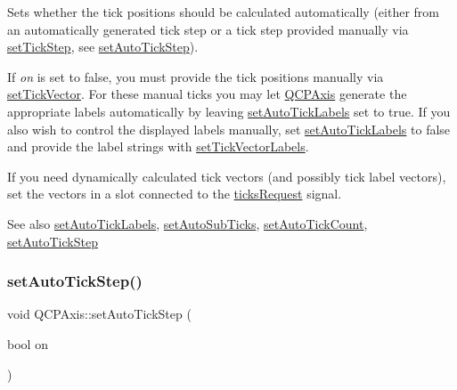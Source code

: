 Sets whether the tick positions should be calculated automatically (either from an automatically generated tick step or a tick step provided manually via \mbox{\hyperlink{class_q_c_p_axis_af727db0acc6492c4c774c0700e738205}{set\+Tick\+Step}}, see \mbox{\hyperlink{class_q_c_p_axis_a99fe77b034e06f5b723995beab96e741}{set\+Auto\+Tick\+Step}}).

If {\itshape on} is set to false, you must provide the tick positions manually via \mbox{\hyperlink{class_q_c_p_axis_a871db94c5d796c80fcbe1a9d4506e27e}{set\+Tick\+Vector}}. For these manual ticks you may let \mbox{\hyperlink{class_q_c_p_axis}{Q\+C\+P\+Axis}} generate the appropriate labels automatically by leaving \mbox{\hyperlink{class_q_c_p_axis_aaa47e3a6bac0c20d4beb9028f01bc1a1}{set\+Auto\+Tick\+Labels}} set to true. If you also wish to control the displayed labels manually, set \mbox{\hyperlink{class_q_c_p_axis_aaa47e3a6bac0c20d4beb9028f01bc1a1}{set\+Auto\+Tick\+Labels}} to false and provide the label strings with \mbox{\hyperlink{class_q_c_p_axis_a921d3ba3853ca3bd2cce3459f7a243ed}{set\+Tick\+Vector\+Labels}}.

If you need dynamically calculated tick vectors (and possibly tick label vectors), set the vectors in a slot connected to the \mbox{\hyperlink{class_q_c_p_axis_af46d99613d29518795134ec4928e3873}{ticks\+Request}} signal.

\begin{DoxySeeAlso}{See also}
\mbox{\hyperlink{class_q_c_p_axis_aaa47e3a6bac0c20d4beb9028f01bc1a1}{set\+Auto\+Tick\+Labels}}, \mbox{\hyperlink{class_q_c_p_axis_adcbdec7a60054b88571e89599f4a45bf}{set\+Auto\+Sub\+Ticks}}, \mbox{\hyperlink{class_q_c_p_axis_a7c7111cbeac9ec5fcb40f93a1ef51a0b}{set\+Auto\+Tick\+Count}}, \mbox{\hyperlink{class_q_c_p_axis_a99fe77b034e06f5b723995beab96e741}{set\+Auto\+Tick\+Step}} 
\end{DoxySeeAlso}
\mbox{\label{class_q_c_p_axis_a99fe77b034e06f5b723995beab96e741}} 
\subsubsection{\texorpdfstring{set\+Auto\+Tick\+Step()}{setAutoTickStep()}}
{\footnotesize\ttfamily void Q\+C\+P\+Axis\+::set\+Auto\+Tick\+Step (\begin{DoxyParamCaption}\item[{bool}]{on }\end{DoxyParamCaption})}


